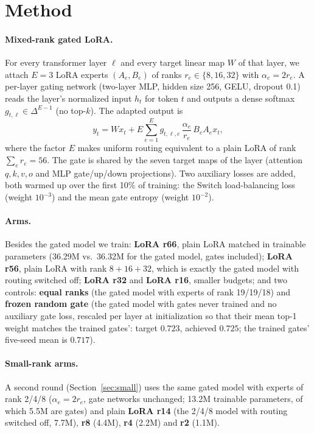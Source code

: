 \documentclass[11pt]{article}
\begin{document}
\section{Method}
\label{sec:method}
\paragraph{Mixed-rank gated LoRA.} For every transformer layer $\ell$ and every target linear map
$W$ of that layer, we attach $E=3$ LoRA experts $(A_e, B_e)$ of ranks $r_e \in \{8, 16, 32\}$
with $\alpha_e = 2 r_e$. A per-layer gating network (two-layer MLP, hidden size 256, GELU,
dropout 0.1) reads the layer's normalized input $h_t$ for token $t$ and outputs a dense softmax
$g_{t,\ell} \in \Delta^{E-1}$ (no top-$k$). The adapted output is
\begin{equation}
  y_t = W x_t + E \sum_{e=1}^{E} g_{t,\ell,e}\, \frac{\alpha_e}{r_e}\, B_e A_e x_t ,
\end{equation}
where the factor $E$ makes uniform routing equivalent to a plain LoRA of rank $\sum_e r_e = 56$.
The gate is shared by the seven target maps of the layer (attention $q,k,v,o$ and MLP
gate/up/down projections). Two auxiliary losses are added, both warmed up over the first 10\% of
training: the Switch load-balancing loss \citep{fedus2022switch} (weight $10^{-3}$) and the mean
gate entropy (weight $10^{-2}$).

\paragraph{Arms.} Besides the gated model we train: \textbf{LoRA r66}, plain LoRA matched in
trainable parameters (36.29M vs.\ 36.32M for the gated model, gates included); \textbf{LoRA r56},
plain LoRA with rank $8{+}16{+}32$, which is exactly the gated model with routing switched off;
\textbf{LoRA r32} and \textbf{LoRA r16}, smaller budgets; and two controls: \textbf{equal ranks}
(the gated model with experts of rank 19/19/18) and \textbf{frozen random gate} (the gated model
with gates never trained and no auxiliary gate loss, rescaled per layer at initialization so that
their mean top-1 weight matches the trained gates': target $0.723$, achieved $0.725$; the trained
gates' five-seed mean is $0.717$).

\paragraph{Small-rank arms.} A second round (Section~\ref{sec:small}) uses the same gated model
with experts of rank 2/4/8 ($\alpha_e = 2 r_e$, gate networks unchanged; 13.2M trainable
parameters, of which 5.5M are gates) and plain \textbf{LoRA r14} (the 2/4/8 model with routing
switched off, 7.7M), \textbf{r8} (4.4M), \textbf{r4} (2.2M) and \textbf{r2} (1.1M).
\end{document}
